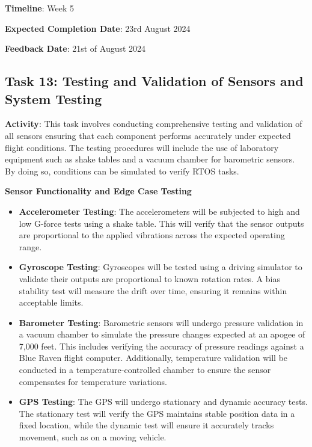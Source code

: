 \textbf{Timeline}: Week 5

\textbf{Expected Completion Date}: 23rd August 2024

\textbf{Feedback Date}: 21st of August 2024

\subsection{Task 13: Testing and Validation of Sensors and System Testing}
\textbf{Activity}: This task involves conducting comprehensive testing and validation of all sensors ensuring that each component performs accurately under expected flight conditions. The testing procedures will include the use of laboratory equipment such as shake tables and a vacuum chamber for barometric sensors. By doing so, conditions can be simulated to verify RTOS tasks. 

\textbf{Sensor Functionality and Edge Case Testing}
\begin{itemize}
    \item \textbf{Accelerometer Testing}: The accelerometers will be subjected to high and low G-force tests using a shake table. This will verify that the sensor outputs are proportional to the applied vibrations across the expected operating range. 
    \item \textbf{Gyroscope Testing}: Gyroscopes will be tested using a driving simulator to validate their outputs are proportional to known rotation rates. A bias stability test will measure the drift over time, ensuring it remains within acceptable limits.
    \item \textbf{Barometer Testing}: Barometric sensors will undergo pressure validation in a vacuum chamber to simulate the pressure changes expected at an apogee of 7,000 feet. This includes verifying the accuracy of pressure readings against a Blue Raven flight computer. Additionally, temperature validation will be conducted in a temperature-controlled chamber to ensure the sensor compensates for temperature variations.
    \item \textbf{GPS Testing}: The GPS will undergo stationary and dynamic accuracy tests. The stationary test will verify the GPS maintains stable position data in a fixed location, while the dynamic test will ensure it accurately tracks movement, such as on a moving vehicle.
\end{itemize}

